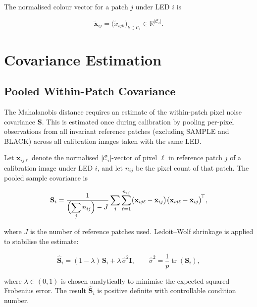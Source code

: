 \documentclass[11pt, a4paper]{article}
\newcommand{\R}{\mathbb{R}}
\newcommand{\bx}{\mathbf{x}}
\newcommand{\bS}{\mathbf{S}}
\newcommand{\bI}{\mathbf{I}}
\newcommand{\tr}{\operatorname{tr}}
\begin{document}
The normalised colour vector for a patch $j$ under LED $i$ is

\begin{equation}
  \tilde{\bx}_{ij}
    = \bigl(\tilde{x}_{ijk}\bigr)_{k \in \mathcal{C}_i}
    \in \R^{|\mathcal{C}_i|}.
\end{equation}

\section{Covariance Estimation}

\subsection{Pooled Within-Patch Covariance}

The Mahalanobis distance requires an estimate of the within-patch
pixel noise covariance $\bS$.  This is estimated once during
calibration by pooling per-pixel observations from all invariant
reference patches (excluding SAMPLE and BLACK) across all calibration
images taken with the same LED.

Let $\mathbf{x}_{ij\ell}$ denote the normalised $|\mathcal{C}_i|$-vector
of pixel $\ell$ in reference patch $j$ of a calibration image under
LED $i$, and let $n_{ij}$ be the pixel count of that patch.
The pooled sample covariance is

\begin{equation}
  \bS_i
    = \frac{1}{\displaystyle\Bigl(\sum_{j} n_{ij}\Bigr) - J}
      \sum_{j}\sum_{\ell=1}^{n_{ij}}
        \bigl(\mathbf{x}_{ij\ell} - \bar{\bx}_{ij}\bigr)
        \bigl(\mathbf{x}_{ij\ell} - \bar{\bx}_{ij}\bigr)^{\!\top},
  \label{eq:pooled-cov}
\end{equation}

where $J$ is the number of reference patches used.
Ledoit--Wolf shrinkage is applied to stabilise the estimate:

\begin{equation}
  \hat{\bS}_i = (1-\lambda)\,\bS_i + \lambda\,\hat{\sigma}^2\bI,
  \qquad
  \hat{\sigma}^2 = \frac{1}{p}\tr(\bS_i),
  \label{eq:lw}
\end{equation}

where $\lambda \in (0,1)$ is chosen analytically to minimise the
expected squared Frobenius error.  The result $\hat{\bS}_i$ is
positive definite with controllable condition number.
\end{document}

